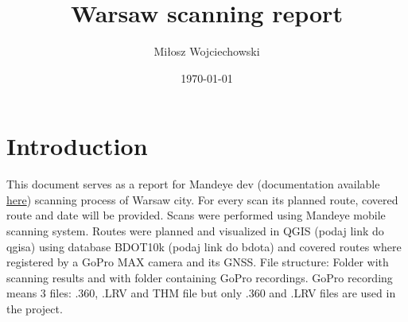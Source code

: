 \documentclass[a4paper,12pt]{article}
\title{Warsaw scanning report}
\author{Miłosz Wojciechowski}
\date{\today}
\begin{document}
\maketitle
\pagebreak
\tableofcontents
\pagebreak

\section{Introduction}
This document serves as a report for Mandeye dev (documentation available \href{link}{here}) scanning process of Warsaw city. For every scan its planned route, covered route and date will be provided. Scans were performed using Mandeye mobile scanning system. Routes were planned and visualized in QGIS (podaj link do qgisa) using database BDOT10k (podaj link do bdota) and covered routes where registered by a GoPro MAX camera and its GNSS. File structure: Folder with scanning results and with folder containing GoPro recordings. GoPro recording means 3 files: .360, .LRV and THM file but only .360 and .LRV files are used in the project.
\end{document}
